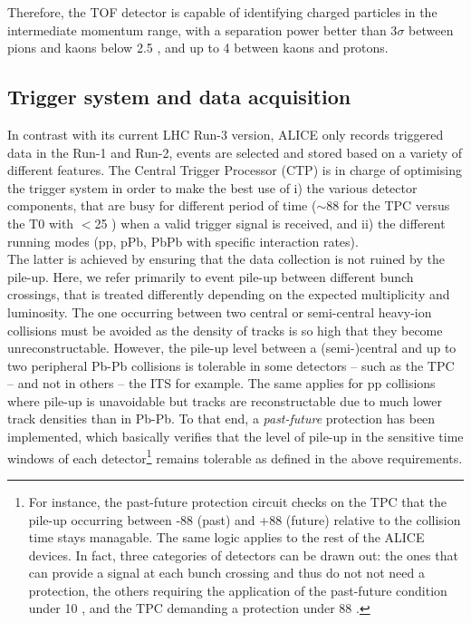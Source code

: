 Therefore, the TOF detector is capable of identifying charged particles in the intermediate momentum range, with a separation power better than 3$\sigma$ between pions and kaons below 2.5 \gmom, and up to 4 \gmom between kaons and protons.

\subsection{Trigger system and data acquisition}
\label{subsec:TriggerSystem}

In contrast with its current LHC Run-3 version, ALICE only records triggered data in the Run-1 and Run-2, \ie events are selected and stored based on a variety of different features. The Central Trigger Processor (CTP) is in charge of optimising the trigger system in order to make the best use of i) the various detector components, that are busy for different period of time ($\sim$88 \musec for the TPC versus the T0 with $<$25 \nsec) when a valid trigger signal is received, and ii) the different running modes (pp, pPb, PbPb with specific interaction rates).\\

The latter is achieved by ensuring that the data collection is not ruined by the pile-up. Here, we refer primarily to event pile-up between different bunch crossings, that is treated differently depending on the expected multiplicity and luminosity. The one occurring between two central or semi-central heavy-ion collisions must be avoided as the density of tracks is so high that they become unreconstructable. However, the pile-up level between a (semi-)central and up to two peripheral Pb-Pb collisions is tolerable in some detectors -- such as the TPC -- and not in others -- the ITS for example. The same applies for pp collisions where pile-up is unavoidable but tracks are reconstructable due to much lower track densities than in Pb-Pb. To that end, a \textit{past-future} protection has been implemented, which basically verifies that the level of pile-up in the sensitive time windows of each detector\footnote{For instance, the past-future protection circuit checks on the TPC that the pile-up occurring between -88 \musec (past) and +88 \musec (future) relative to the collision time stays managable. The same logic applies to the rest of the ALICE devices. In fact, three categories of detectors can be drawn out: the ones that can provide a signal at each bunch crossing and thus do not not need a protection, the others requiring the application of the past-future condition under 10 \musec, and the TPC demanding a protection under 88 \musec.} remains tolerable as defined in the above requirements.\\


